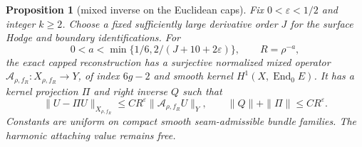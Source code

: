 \documentclass[11pt]{amsart}
\newtheorem{proposition}[theorem]{Proposition}
\theoremstyle{definition}
\theoremstyle{remark}
\theoremstyle{plain}
\newcommand{\End}{\operatorname{End}}
\begin{document}
\begin{proposition}[mixed inverse on the Euclidean caps]
\label{prop:capped-mixed-inverse}
Fix $0<\varepsilon<1/2$ and integer $k\geq2$. Choose a fixed
sufficiently large derivative order $J$ for the surface Hodge
and boundary identifications. For
\begin{equation}\label{eq:capped-radius-range}
 0<a<\min\{1/6,2/(J+10+2\varepsilon)\},\qquad R=\rho^{-a},
\end{equation}
the exact capped reconstruction has a surjective normalized mixed
operator $\mathcal A_{\rho,f_R}:X_{\rho,f_R}\to Y$, of index
$6g-2$ and smooth kernel $H^1(X,\End_0E)$. It has a kernel
projection $\Pi$ and right inverse $Q$ such that
\begin{equation}\label{eq:capped-mixed-inverse-bound}
 \|U-\Pi U\|_{X_{\rho,f_R}}\leq CR^\varepsilon
                           \|\mathcal A_{\rho,f_R}U\|_Y,
 \qquad \|Q\|+\|\Pi\|\leq CR^\varepsilon.
\end{equation}
Constants are uniform on compact smooth seam-admissible bundle
families. The harmonic attaching value remains free.
\end{proposition}
\end{document}
